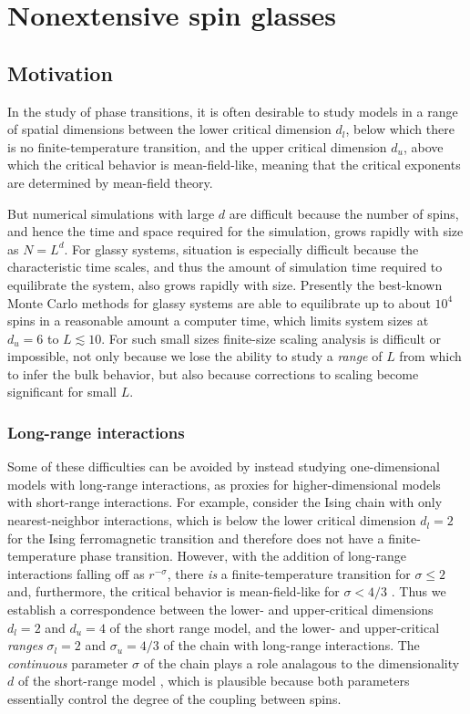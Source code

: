 \chapter{Nonextensive spin glasses}
\label{chap:nonextensive}

\section{Motivation}
\label{sec:nonextensive-motivation}

In the study of phase transitions, it is often desirable to study models in a
range of spatial dimensions between the lower critical dimension $d_l$, below
which there is no finite-temperature transition, and the upper critical
dimension $d_u$, above which the critical behavior is mean-field-like, meaning
that the critical exponents are determined by mean-field theory.

But numerical simulations with large $d$ are difficult because the number of
spins, and hence the time and space required for the simulation, grows rapidly
with size as $N=L^d$. For glassy systems, situation is especially difficult
because the characteristic time scales, and thus the amount of simulation time
required to equilibrate the system, also grows rapidly with size. Presently the
best-known Monte Carlo methods for glassy systems are able to equilibrate up to
about $10^4$ spins in a reasonable amount a computer time, which limits system
sizes at $d_u=6$ to $L \lesssim 10$. For such small sizes finite-size scaling
analysis is difficult or impossible, not only because we lose the ability to
study a \emph{range} of $L$ from which to infer the bulk behavior, but also
because corrections to scaling become significant for small $L$.


\subsection{Long-range interactions}

Some of these difficulties can be avoided by instead studying one-dimensional
models with long-range interactions, as proxies for higher-dimensional models
with short-range interactions. For example, consider the Ising
chain with only nearest-neighbor interactions, which is below the lower
critical dimension $d_l=2$ for the Ising ferromagnetic transition and therefore
does not have a finite-temperature phase transition. However, with the addition
of long-range interactions falling off as $r^{-\sigma}$, there \emph{is} a
finite-temperature transition for $\sigma \leq 2$
 and, furthermore, the critical behavior is mean-field-like for $\sigma < 4/3$
 \autocite{dyson1969existence}.
Thus we establish a correspondence between the lower- and upper-critical
dimensions $d_l=2$ and $d_u=4$ of the short range model, and the lower- and
upper-critical \emph{ranges} $\sigma_l=2$ and $\sigma_u=4/3$ of the chain with
long-range interactions. The \emph{continuous} parameter $\sigma$ of the chain
plays a role analagous to the dimensionality $d$ of the short-range model
\autocite{katzgraber2003monte}, which is plausible because both parameters
essentially control the degree of the coupling between spins.

